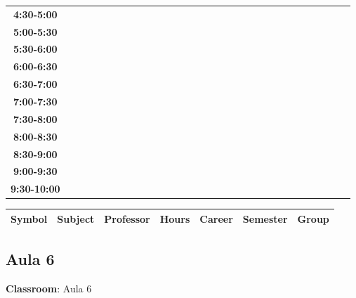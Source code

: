 \documentclass{article}
\begin{document}
\begin{table}[ht]
\begin{tabular}{|c|c|c|c|c|c|c|c|c|c|c|c|c|c|c|c|c|c|c|c|c|c|c|c|c|c|c|c|c|c|}
 \cline{1-8} 
\textbf{4:30-5:00} &   &   &   &   &   &   &   \\
 \cline{1-8} 
\textbf{5:00-5:30} &   &   &   &   &   &   &   \\
 \cline{1-8} 
\textbf{5:30-6:00} &   &   &   &   &   &   &   \\
 \cline{1-8} 
\textbf{6:00-6:30} &   &   &   &   &   &   &   \\
 \cline{1-8} 
\textbf{6:30-7:00} &   &   &   &   &   &   &   \\
 \cline{1-8} 
\textbf{7:00-7:30} &   &   &   &   &   &   &   \\
 \cline{1-8} 
\textbf{7:30-8:00} &   &   &   &   &   &   &   \\
 \cline{1-8} 
\textbf{8:00-8:30} &   &   &   &   &   &   &   \\
 \cline{1-8} 
\textbf{8:30-9:00} &   &   &   &   &   &   &   \\
 \cline{1-8} 
\textbf{9:00-9:30} &   &   &   &   &   &   &   \\
 \cline{1-8} 
\textbf{9:30-10:00} &   &   &   &   &   &   &   \\
 \cline{1-8} 
\end{tabular}\end{table}

        
        \begin{tabular}{|>{\centering\arraybackslash}m{2cm}|>{\centering\arraybackslash}m{4cm}|>{\centering\arraybackslash}m{2.15cm}|>{\centering\arraybackslash}m{1.8cm}|>{\centering\arraybackslash}m{2cm}|>{\centering\arraybackslash}m{2cm}|>{\centering\arraybackslash}m{2cm}|}
        \hline
        \textbf{Symbol} & \textbf{Subject} & \textbf{Professor} & \textbf{Hours} & \textbf{Career} & \textbf{Semester} & \textbf{Group} \\
        \hline
        \end{tabular}
                    

        \newpage
        

        \subsection{Aula 6}
        \vspace*{.1cm}
        
        \begin{flushright}
            {\LARGE \textbf{Classroom}: Aula 6}
        \end{flushright}
        \vspace{1cm}
\end{document}
